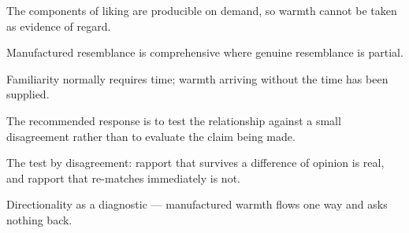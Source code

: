 

\begin{distilled}
  \item The components of liking are producible on demand, so warmth cannot be taken as evidence of regard.
  \item Manufactured resemblance is comprehensive where genuine resemblance is partial.
  \item Familiarity normally requires time; warmth arriving without the time has been supplied.
  \item The recommended response is to test the relationship against a small disagreement rather than to evaluate the claim being made.
\end{distilled}

\begin{unique}
  \item The test by disagreement: rapport that survives a difference of opinion is real, and rapport that re-matches immediately is not.
  \item Directionality as a diagnostic --- manufactured warmth flows one way and asks nothing back.
\end{unique}
